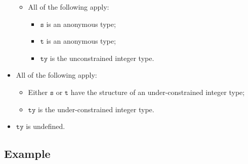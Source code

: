 \documentclass{book}
\newcommand\vt[0]{\texttt{t}}
\newcommand\vs[0]{\texttt{s}}
\newcommand\tty[0]{\texttt{ty}}
\begin{document}
\begin{itemize}
\begin{itemize}
      \item All of the following apply:
        \begin{itemize}
        \item $\vs$ is an anonymous type;
        \item $\vt$ is an anonymous type;
	\item $\tty$ is the unconstrained integer type.
        \end{itemize}
    \end{itemize}

  \item All of the following apply:
    \begin{itemize}
    \item Either $\vs$ or $\vt$ have the structure of an under-constrained integer type;
    \item $\tty$ is the under-constrained integer type.
    \end{itemize}

  \item $\tty$ is undefined.
  \end{itemize}

  \subsection{Example}


\end{document}
